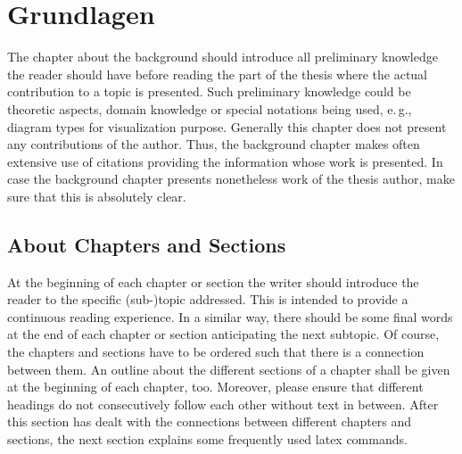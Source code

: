 \chapter{Grundlagen}
\label{sect:basics}

The chapter about the background should introduce all preliminary knowledge the reader should have before reading the part of the thesis where the actual contribution to a topic is presented.
Such preliminary knowledge could be theoretic aspects, domain knowledge or special notations being used, e.\,g., diagram types for visualization purpose.
Generally this chapter does not present any contributions of the author.
Thus, the background chapter makes often extensive use of citations providing the information whose work is presented.
In case the background chapter presents nonetheless work of the thesis author, make sure that this is absolutely clear.







\section{About Chapters and Sections}
\label{sect:chaptsect}

At the beginning of each chapter or section the writer should introduce the reader to the specific (sub-)topic addressed.
This is intended to provide a continuous reading experience.
In a similar way, there should be some final words at the end of each chapter or section anticipating the next subtopic.
Of course, the chapters and sections have to be ordered such that there is a connection between them.
An outline about the different sections of a chapter shall be given at the beginning of each chapter, too.
Moreover, please ensure that different headings do not consecutively follow each other without text in between.
After this section has dealt with the connections between different chapters and sections, the next section explains some frequently used latex commands.

